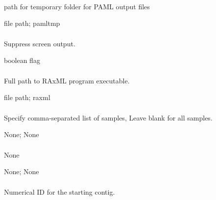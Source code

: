 \documentclass[letterpaper,11pt,english]{sphinxmanual}
\begin{document}
\subsubsection{}
\label{\detokenize{prog_desc:paml-tmp-pamltmp}}
 path for temporary folder for PAML output files

 file path;  pamltmp


\subsubsection{}
\label{\detokenize{prog_desc:id113}}
 Suppress screen output.

 boolean flag


\subsubsection{}
\label{\detokenize{prog_desc:raxml-path-raxmlpath}}
 Full path to RAxML program executable.

 file path;  raxml


\subsubsection{}
\label{\detokenize{prog_desc:samples}}
 Specify comma-separated list of samples, Leave blank for all samples.

 None;  None


\subsubsection{}
\label{\detokenize{prog_desc:species-groups-speciesgroups}}
 None

 None;  None


\subsubsection{}
\label{\detokenize{prog_desc:start-contig-startcontig}}
 Numerical ID for the starting contig.
\end{document}
